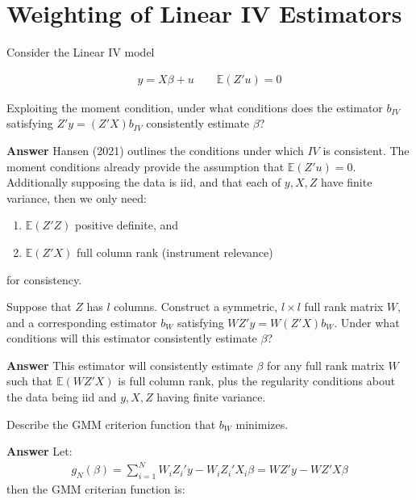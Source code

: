 \documentclass[11pt]{exam}
\providecommand{\tightlist}{%
      \setlength{\itemsep}{0pt}\setlength{\parskip}{0pt}}
\begin{document}
    \hypertarget{weighting-of-linear-iv-estimators}{%
\section{Weighting of Linear IV
Estimators}\label{weighting-of-linear-iv-estimators}}

Consider the Linear IV model

\begin{align*}
y = X\beta + u \qquad\mathbb{E}(Z'u) = 0
\end{align*}

\begin{questions}
    \question Exploiting the moment condition, under what conditions does
the estimator \(b_{IV}\) satisfying \(Z'y = (Z'X)b_{IV}\) consistently
estimate \(\beta\)?

\textbf{Answer} Hansen (2021) outlines the conditions under which \(IV\)
is consistent. The moment conditions already provide the assumption that
\(\mathbb{E}(Z'u) = 0\). Additionally supposing the data is iid, and
that each of \(y, X, Z\) have finite variance, then we only need:

\begin{enumerate}
\def\labelenumi{\arabic{enumi}.}
\tightlist
\item
  \(\mathbb{E}(Z'Z)\) positive definite, and
\item
  \(\mathbb{E}(Z'X)\) full column rank (instrument relevance)
\end{enumerate}

for consistency.

    \question Suppose that \(Z\) has \(l\) columns. Construct a
symmetric, \(l\times l\) full rank matrix \(W\), and a corresponding
estimator \(b_W\) satisfying \(WZ'y = W(Z'X)b_W\). Under what conditions
will this estimator consistently estimate \(\beta\)?

\textbf{Answer} This estimator will consistently estimate \(\beta\) for
any full rank matrix \(W\) such that \(\mathbb{E}(WZ'X)\) is full column
rank, plus the regularity conditions about the data being iid and
\(y, X, Z\) having finite variance.

    \question Describe the GMM criterion function that $b_W$ minimizes.

\textbf{Answer} Let:
\begin{align*}
g_N(\beta) = \sum_{i=1}^N W_iZ_i'y - W_iZ_i'X_i\beta = WZ'y - WZ'X\beta
\end{align*}
then the GMM criterian function is:


\end{questions}
\end{document}

